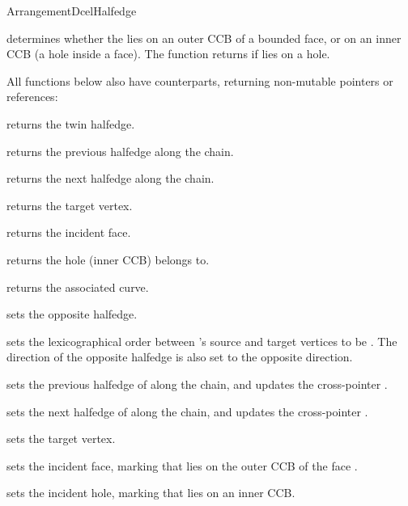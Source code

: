 \begin{ccRefConcept}{ArrangementDcelHalfedge}
{
    {determines whether the \ccVar{} lies on an outer CCB of a bounded face,
     or on an inner CCB (a hole inside a face). The function returns 
     if \ccVar{} lies on a hole.}

All functions below also have  counterparts, returning non-mutable
pointers or references:

    {returns the twin halfedge.}

    {returns the previous halfedge along the chain.}

    {returns the next halfedge along the chain.}

    {returns the target vertex.}

    {returns the incident face.
     }

    {returns the hole (inner CCB) \ccVar{} belongs to.
     }

    {returns the associated curve.}

\ccModifiers

    {sets the opposite halfedge.}

    {sets the lexicographical order between \ccVar{}'s source and target
     vertices to be . The direction of the opposite halfedge is
     also set to the opposite direction.
     }

    {sets the previous halfedge of \ccVar{} along the chain,
     and updates the cross-pointer .}

    {sets the next halfedge of \ccVar{} along the chain,
     and updates the cross-pointer .}

    {sets the target vertex.}

    {sets the incident face, marking that \ccVar{} lies on the outer CCB
     of the face .}

    {sets the incident hole, marking that \ccVar{} lies on an inner CCB.}

}
\end{ccRefConcept}
